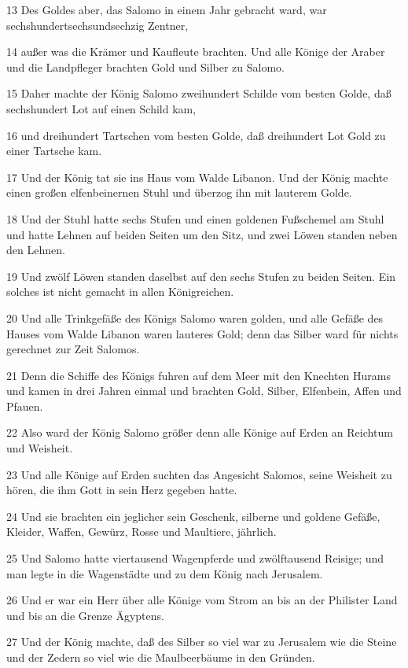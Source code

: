 \par 13 Des Goldes aber, das Salomo in einem Jahr gebracht ward, war sechshundertsechsundsechzig Zentner,
\par 14 außer was die Krämer und Kaufleute brachten. Und alle Könige der Araber und die Landpfleger brachten Gold und Silber zu Salomo.
\par 15 Daher machte der König Salomo zweihundert Schilde vom besten Golde, daß sechshundert Lot auf einen Schild kam,
\par 16 und dreihundert Tartschen vom besten Golde, daß dreihundert Lot Gold zu einer Tartsche kam.
\par 17 Und der König tat sie ins Haus vom Walde Libanon. Und der König machte einen großen elfenbeinernen Stuhl und überzog ihn mit lauterem Golde.
\par 18 Und der Stuhl hatte sechs Stufen und einen goldenen Fußschemel am Stuhl und hatte Lehnen auf beiden Seiten um den Sitz, und zwei Löwen standen neben den Lehnen.
\par 19 Und zwölf Löwen standen daselbst auf den sechs Stufen zu beiden Seiten. Ein solches ist nicht gemacht in allen Königreichen.
\par 20 Und alle Trinkgefäße des Königs Salomo waren golden, und alle Gefäße des Hauses vom Walde Libanon waren lauteres Gold; denn das Silber ward für nichts gerechnet zur Zeit Salomos.
\par 21 Denn die Schiffe des Königs fuhren auf dem Meer mit den Knechten Hurams und kamen in drei Jahren einmal und brachten Gold, Silber, Elfenbein, Affen und Pfauen.
\par 22 Also ward der König Salomo größer denn alle Könige auf Erden an Reichtum und Weisheit.
\par 23 Und alle Könige auf Erden suchten das Angesicht Salomos, seine Weisheit zu hören, die ihm Gott in sein Herz gegeben hatte.
\par 24 Und sie brachten ein jeglicher sein Geschenk, silberne und goldene Gefäße, Kleider, Waffen, Gewürz, Rosse und Maultiere, jährlich.
\par 25 Und Salomo hatte viertausend Wagenpferde und zwölftausend Reisige; und man legte in die Wagenstädte und zu dem König nach Jerusalem.
\par 26 Und er war ein Herr über alle Könige vom Strom an bis an der Philister Land und bis an die Grenze Ägyptens.
\par 27 Und der König machte, daß des Silber so viel war zu Jerusalem wie die Steine und der Zedern so viel wie die Maulbeerbäume in den Gründen.

